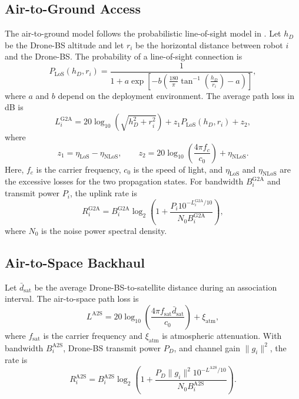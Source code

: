 \IfFileExists{IEEEtran.cls}{\documentclass[conference]{IEEEtran}}{\documentclass[10pt,twocolumn]{article}}
\begin{document}
\subsection{Air-to-Ground Access}
The air-to-ground model follows the probabilistic line-of-sight model in \cite{boryaliniz2019spatial}. Let $h_D$ be the Drone-BS altitude and let $r_i$ be the horizontal distance between robot $i$ and the Drone-BS. The probability of a line-of-sight connection is
\begin{equation}
    P_{\mathrm{LoS}}(h_D,r_i)
    =
    \frac{1}{1+a\exp\!\left[-b\left(\frac{180}{\pi}\tan^{-1}\!\left(\frac{h_D}{r_i}\right)-a\right)\right]},
    \label{eq:los_probability}
\end{equation}
where $a$ and $b$ depend on the deployment environment. The average path loss in dB is
\begin{equation}
    L_i^{\mathrm{G2A}}
    =
    20\log_{10}\!\left(\sqrt{h_D^2+r_i^2}\right)
    +z_1P_{\mathrm{LoS}}(h_D,r_i)+z_2,
    \label{eq:g2a_pathloss}
\end{equation}
where
\begin{equation}
    z_1=\eta_{\mathrm{LoS}}-\eta_{\mathrm{NLoS}},\qquad
    z_2=20\log_{10}\!\left(\frac{4\pi f_c}{c_0}\right)+\eta_{\mathrm{NLoS}}.
\end{equation}
Here, $f_c$ is the carrier frequency, $c_0$ is the speed of light, and $\eta_{\mathrm{LoS}}$ and $\eta_{\mathrm{NLoS}}$ are the excessive losses for the two propagation states. For bandwidth $B_i^{\mathrm{G2A}}$ and transmit power $P_i$, the uplink rate is
\begin{equation}
    R_i^{\mathrm{G2A}}
    =B_i^{\mathrm{G2A}}
    \log_2\!\left(1+
    \frac{P_i10^{-L_i^{\mathrm{G2A}}/10}}
    {N_0B_i^{\mathrm{G2A}}}\right),
    \label{eq:g2a_rate}
\end{equation}
where $N_0$ is the noise power spectral density.

\subsection{Air-to-Space Backhaul}
Let $\bar d_{\mathrm{sat}}$ be the average Drone-BS-to-satellite distance during an association interval. The air-to-space path loss is
\begin{equation}
    L^{\mathrm{A2S}}
    =20\log_{10}\!\left(\frac{4\pi f_{\mathrm{sat}}\bar d_{\mathrm{sat}}}{c_0}\right)+\xi_{\mathrm{atm}},
\end{equation}
where $f_{\mathrm{sat}}$ is the carrier frequency and $\xi_{\mathrm{atm}}$ is atmospheric attenuation. With bandwidth $B_i^{\mathrm{A2S}}$, Drone-BS transmit power $P_D$, and channel gain $\lVert g_i\rVert^2$, the rate is
\begin{equation}
    R_i^{\mathrm{A2S}}
    =B_i^{\mathrm{A2S}}
    \log_2\!\left(1+
    \frac{P_D\lVert g_i\rVert^2 10^{-L^{\mathrm{A2S}}/10}}
    {N_0B_i^{\mathrm{A2S}}}\right).
\end{equation}
\end{document}
